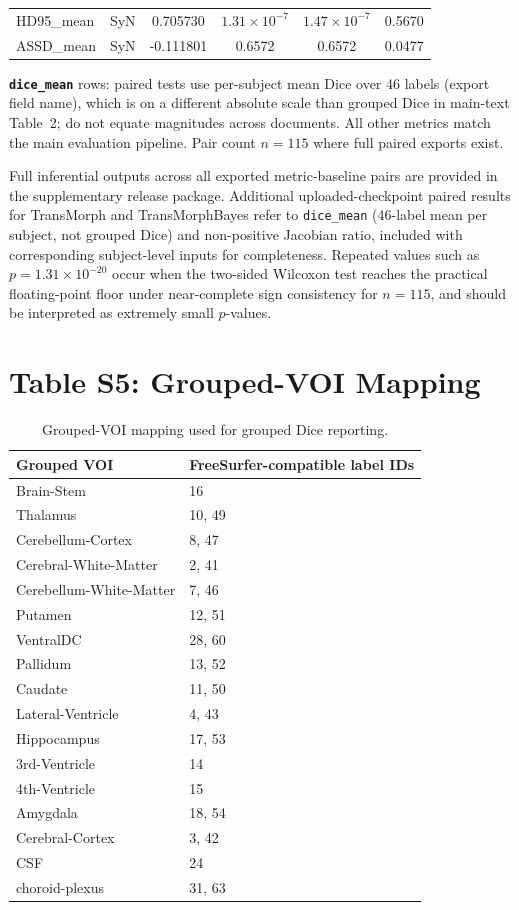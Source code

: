 \documentclass[11pt,a4paper]{article}
\begin{document}
\begin{table}[H]
\begin{tabularx}{\textwidth}{llcccc}
HD95\_mean & SyN & 0.705730 & \(1.31\times 10^{-7}\) & \(1.47\times 10^{-7}\) & 0.5670 \\
ASSD\_mean & SyN & -0.111801 & 0.6572 & 0.6572 & 0.0477 \\
\bottomrule
\end{tabularx}
\parbox{\textwidth}{\footnotesize \textbf{\texttt{dice\_mean}} rows: paired tests use per-subject mean Dice over 46 labels (export field name), which is on a different absolute scale than grouped Dice in main-text Table~2; do not equate magnitudes across documents. All other metrics match the main evaluation pipeline. Pair count \(n=115\) where full paired exports exist.}
\end{table}

\noindent\footnotesize Full inferential outputs across all exported metric-baseline pairs are provided in the supplementary release package. Additional uploaded-checkpoint paired results for TransMorph and TransMorphBayes refer to \texttt{dice\_mean} (46-label mean per subject, not grouped Dice) and non-positive Jacobian ratio, included with corresponding subject-level inputs for completeness. Repeated values such as \(p=1.31\times 10^{-20}\) occur when the two-sided Wilcoxon test reaches the practical floating-point floor under near-complete sign consistency for \(n=115\), and should be interpreted as extremely small \(p\)-values.

\section{Table S5: Grouped-VOI Mapping}

\begin{table}[H]
\caption{Grouped-VOI mapping used for grouped Dice reporting.}
\scriptsize
\begin{tabularx}{\textwidth}{lX}
\toprule
\textbf{Grouped VOI} & \textbf{FreeSurfer-compatible label IDs} \\
\midrule
Brain-Stem & 16 \\
Thalamus & 10, 49 \\
Cerebellum-Cortex & 8, 47 \\
Cerebral-White-Matter & 2, 41 \\
Cerebellum-White-Matter & 7, 46 \\
Putamen & 12, 51 \\
VentralDC & 28, 60 \\
Pallidum & 13, 52 \\
Caudate & 11, 50 \\
Lateral-Ventricle & 4, 43 \\
Hippocampus & 17, 53 \\
3rd-Ventricle & 14 \\
4th-Ventricle & 15 \\
Amygdala & 18, 54 \\
Cerebral-Cortex & 3, 42 \\
CSF & 24 \\
choroid-plexus & 31, 63 \\
\bottomrule
\end{tabularx}
\end{table}
\end{document}
